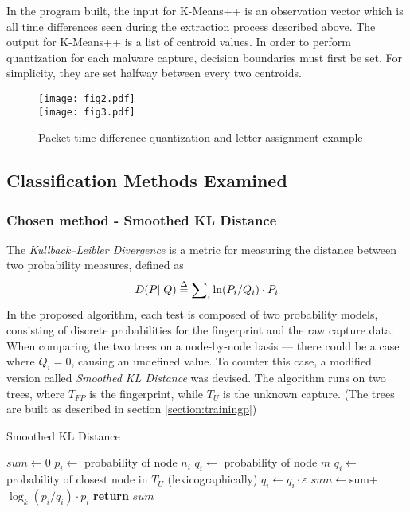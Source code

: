 \documentclass[13pt,journal,compsoc,onecolumn]{IEEEtran}
\begin{document}
In the program built, the input for K-Means++ is an observation vector which is all time differences seen during the extraction process described above.
The output for K-Means++ is a list of centroid values.
In order to perform quantization for each malware capture, decision boundaries must first be set. For simplicity, they are set halfway between every two centroids.
\begin{figure}[!h]
 \centering
 \texttt{[image: fig2.pdf]}\\
 \texttt{[image: fig3.pdf]}
 \caption{Packet time difference quantization and letter assignment example\label{fig:packetquant}}
\end{figure} 
\subsection{Classification Methods Examined}
\subsubsection{Chosen method - Smoothed KL Distance}
The \emph{Kullback--Leibler Divergence} is a metric for measuring the distance between two probability measures, defined as 
\begin{equation}\label{eq:kld}
D(P||Q) \buildrel \Delta \over = \sum\nolimits_i {\ln ({P_i}/{Q_i}) \cdot {P_i}}
\end{equation}
In the proposed algorithm, each test is composed of two probability models, consisting of discrete probabilities for the fingerprint and the raw capture data. When comparing the two trees on a node-by-node basis --- there could be a case where $Q_i=0$, causing an undefined value.
To counter this case, a modified version called \emph{Smoothed KL Distance} was devised.
The algorithm runs on two trees, where $T_{FP}$ is the fingerprint, while $T_U$ is the unknown capture.
(The trees are built as described in section \ref{section:trainingp})
\begin{algorithm}
\caption{Smoothed KL Distance}\label{kld}
\begin{algorithmic}[1]
\State $sum\gets0$
      \State $p_i\gets$ probability of node $n_i$
      	\State $q_i\gets$ probability of node $m$
      \Else
      	\State $q_i\gets$ probability of closest node in $T_U$ (lexicographically)
      	\State $q_i\gets q_i\cdot\varepsilon$
      \EndIf
   \State$sum\gets 
   $sum+$ \log_k (p_i/q_i) \cdot {p_i}$
   \EndFor\label{euclidendwhile}
   \State \textbf{return} $sum$
\EndProcedure
\end{algorithmic}
\end{algorithm}
\end{document}
